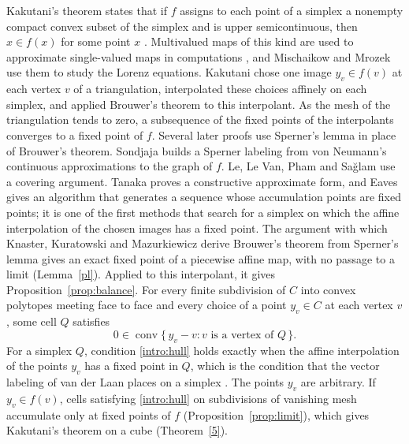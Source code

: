 \documentclass[11pt]{amsart}
\theoremstyle{definition}
\theoremstyle{remark}
\numberwithin{equation}{section}
\DeclareMathOperator{\conv}{conv}
\begin{document}
Kakutani's theorem states that if $f$ assigns to each point of a simplex a nonempty compact convex subset of the simplex and is upper semicontinuous, then $x\in f(x)$ for some point $x$ \cite[Theorem~1]{KF}. Multivalued maps of this kind are used to approximate single-valued maps in computations \cite{Kaczynski2008}, and Mischaikow and Mrozek \cite{MM} use them to study the Lorenz equations. Kakutani \cite{KF} chose one image $y_v\in f(v)$ at each vertex $v$ of a triangulation, interpolated these choices affinely on each simplex, and applied Brouwer's theorem to this interpolant. As the mesh of the triangulation tends to zero, a subsequence of the fixed points of the interpolants converges to a fixed point of $f$. Several later proofs use Sperner's lemma in place of Brouwer's theorem. Sondjaja \cite[\S3.3]{LM} builds a Sperner labeling from von Neumann's continuous approximations to the graph of $f$. Le, Le Van, Pham and Sa\u{g}lam \cite[\S3.3, Theorem~1]{Le} use a covering argument. Tanaka \cite{YT} proves a constructive approximate form, and Eaves \cite{Eaves} gives an algorithm that generates a sequence whose accumulation points are fixed points; it is one of the first methods that search for a simplex on which the affine interpolation of the chosen images has a fixed point. The argument with which Knaster, Kuratowski and Mazurkiewicz \cite{KKM29} derive Brouwer's theorem from Sperner's lemma gives an exact fixed point of a piecewise affine map, with no passage to a limit (Lemma~\ref{pl}). Applied to this interpolant, it gives Proposition~\ref{prop:balance}. For every finite subdivision of $C$ into convex polytopes meeting face to face and every choice of a point $y_v\in C$ at each vertex $v$, some cell $Q$ satisfies
\begin{equation}\label{intro:hull}
     0\in\conv\{\,y_v-v : v\text{ is a vertex of }Q\,\}.
\end{equation}
For a simplex $Q$, condition \eqref{intro:hull} holds exactly when the affine interpolation of the points $y_v$ has a fixed point in $Q$, which is the condition that the vector labeling of van der Laan places on a simplex \cite[\S4.8]{Laa80}. The points $y_v$ are arbitrary. If $y_v\in f(v)$, cells satisfying \eqref{intro:hull} on subdivisions of vanishing mesh accumulate only at fixed points of $f$ (Proposition~\ref{prop:limit}), which gives Kakutani's theorem on a cube (Theorem~\ref{5}).
\end{document}
